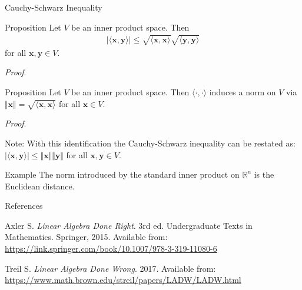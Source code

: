 \documentclass [aspectratio=169]{beamer}
\newcommand{\bx}{{\mathbf{x}}}
\newcommand{\by}{{\mathbf{y}}}
\newcommand{\innerprod}[1]{\langle #1 \rangle}
\newcommand{\R}{{\mathbb{R}}}
\begin{document}
\begin{frame}{Cauchy-Schwarz Inequality}
\begin{exampleblock}{Proposition}
Let $V$ be an inner product space. Then 
\begin{align*}
    \vert \innerprod{\bx,\by}\vert \leq \sqrt{\innerprod{\bx,\bx}}\sqrt{\innerprod{\by,\by}}
\end{align*}
for all $\bx,\by\in V$.
\end{exampleblock}
\end{frame}

\begin{frame}
\textit{Proof}.
\vspace{6.5cm}
\end{frame}


\begin{frame}
\begin{exampleblock}{Proposition}
Let $V$ be an inner product space. Then $\innerprod{\cdot,\cdot}$ induces a norm on $V$ via $\Vert \bx\Vert =\sqrt{\innerprod{\bx,\bx}} $ for all $\bx \in V$.
\end{exampleblock}
\textit{Proof}.
\vspace{4cm}
\end{frame}

\begin{frame}

\end{frame}

\begin{frame}
Note:
With this identification the Cauchy-Schwarz inequality can be restated as: $ \vert \innerprod{\bx,\by}\vert \leq \Vert \bx \Vert \Vert \by \Vert$ for all $\bx, \by\in V$.

\vspace{2em}

\begin{exampleblock}{Example}
The norm introduced by the standard inner product on $\R^n$ is the Euclidean distance. 
\end{exampleblock}
\end{frame}


\begin{frame}{References}

Axler S. \textit{Linear Algebra Done Right}. 3rd ed. Undergraduate Texts in Mathematics. Springer, 2015.
Available from: \href{https://link.springer.com/book/10.1007/978-3-319-11080-6}{https://link.springer.com/book/10.1007/978-3-319-11080-6} 

\vspace{1em}


\indent Treil S. \textit{Linear Algebra Done Wrong}. 2017. Available from: \href{https://www.math.brown.edu/streil/papers/LADW/LADW.html}{https://www.math.brown.edu/streil/papers/LADW/LADW.html}
\end{frame}
\end{document}
